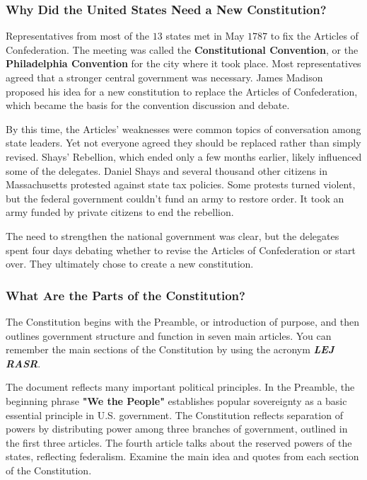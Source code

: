 \newpage

\subsubsection*{Why Did the United States Need a New Constitution?}

Representatives from most of the $13$ states met in May $1787$ to fix the Articles of Confederation. The meeting was called the
\textbf{Constitutional Convention}, or the \textbf{Philadelphia Convention} for the city where it took place. Most representatives agreed
that a stronger central government was necessary. James Madison proposed his idea for a new constitution to replace the Articles of
Confederation, which became the basis for the convention discussion and debate.

By this time, the Articles' weaknesses were common topics of conversation among state leaders. Yet not everyone agreed they should be
replaced rather than simply revised. Shays' Rebellion, which ended only a few months earlier, likely influenced some of the delegates.
Daniel Shays and several thousand other citizens in Massachusetts protested against state tax policies. Some protests turned violent, but
the federal government couldn't fund an army to restore order. It took an army funded by private citizens to end the rebellion.

The need to strengthen the national government was clear, but the delegates spent four days debating whether to revise the Articles of
Confederation or start over. They ultimately chose to create a new constitution.

\subsubsection*{What Are the Parts of the Constitution?}

The Constitution begins with the Preamble, or introduction of purpose, and then outlines government structure and function in seven main
articles. You can remember the main sections of the Constitution by using the acronym \textbf{\textit{LEJ RASR}}.

The document reflects many important political principles. In the Preamble, the beginning phrase \textbf{"We the People"} establishes
popular sovereignty as a basic essential principle in U.S. government. The Constitution reflects separation of powers by distributing power
among three branches of government, outlined in the first three articles. The fourth article talks about the reserved powers of the states,
reflecting federalism. Examine the main idea and quotes from each section of the Constitution.

